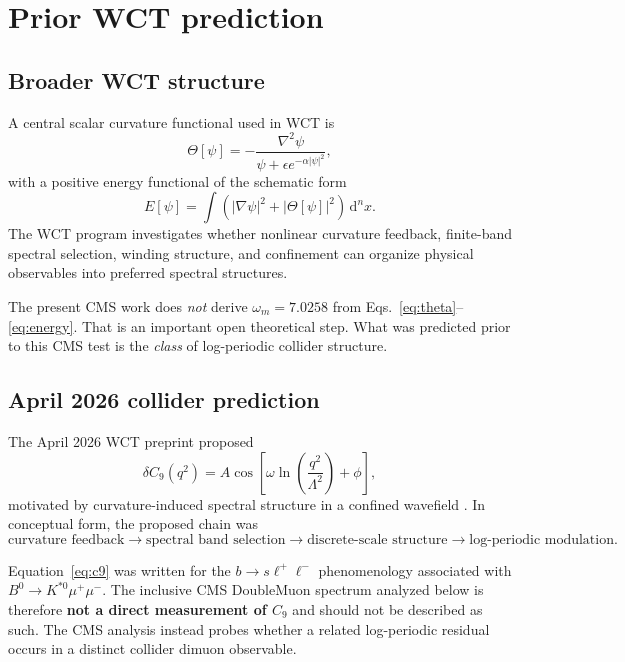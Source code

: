 \documentclass[11pt]{article}
\newcommand{\dd}{\mathrm{d}}
\begin{document}
\section{Prior WCT prediction}

\subsection{Broader WCT structure}

A central scalar curvature functional used in WCT is
\begin{equation}
\Theta[\psi]
=
-\frac{\nabla^2\psi}
{\psi+\epsilon e^{-\alpha|\psi|^2}},
\label{eq:theta}
\end{equation}
with a positive energy functional of the schematic form
\begin{equation}
E[\psi]
=
\int
\left(
|\nabla\psi|^2 + |\Theta[\psi]|^2
\right)\,\dd^n x.
\label{eq:energy}
\end{equation}
The WCT program investigates whether nonlinear curvature feedback, finite-band
spectral selection, winding structure, and confinement can organize physical
observables into preferred spectral structures.

The present CMS work does \emph{not} derive
\(\omega_m=7.0258\) from Eqs.~\eqref{eq:theta}--\eqref{eq:energy}.  That is an
important open theoretical step.  What was predicted prior to this CMS test is
the \emph{class} of log-periodic collider structure.

\subsection{April 2026 collider prediction}

The April 2026 WCT preprint proposed
\begin{equation}
\delta C_9(q^2)
=
A\cos\!\left[
\omega\ln\!\left(\frac{q^2}{\Lambda^2}\right)+\phi
\right],
\label{eq:c9}
\end{equation}
motivated by curvature-induced spectral structure in a confined wavefield
\cite{ReyesC9}.  In conceptual form, the proposed chain was
\begin{equation}
\text{curvature feedback}
\longrightarrow
\text{spectral band selection}
\longrightarrow
\text{discrete-scale structure}
\longrightarrow
\text{log-periodic modulation}.
\label{eq:wct_chain}
\end{equation}

Equation~\eqref{eq:c9} was written for the
\(b\to s\ell^+\ell^-\) phenomenology associated with
\(B^0\to K^{*0}\mu^+\mu^-\).  The inclusive CMS DoubleMuon spectrum analyzed
below is therefore \textbf{not a direct measurement of \(C_9\)} and should not
be described as such.  The CMS analysis instead probes whether a related
log-periodic residual occurs in a distinct collider dimuon observable.
\end{document}
